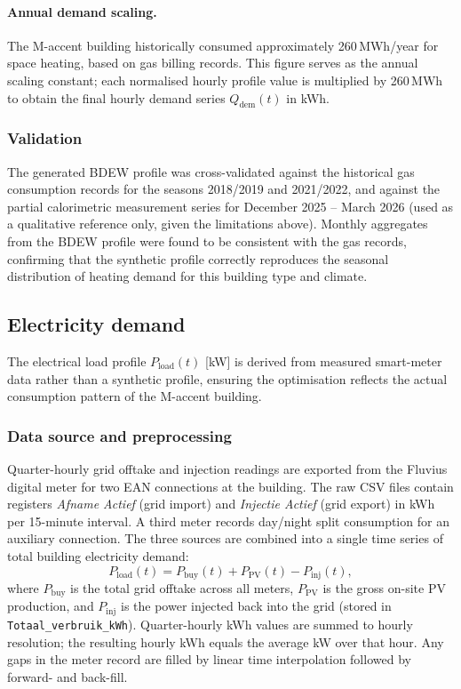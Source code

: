 \documentclass[11pt,a4paper]{report}
\begin{document}
\paragraph{Annual demand scaling.}
The M-accent building historically consumed approximately 260\,MWh/year for space heating, based on gas billing records.
This figure serves as the annual scaling constant; each normalised hourly profile value is multiplied by 260\,MWh to obtain the final hourly demand series $Q_\mathrm{dem}(t)$ in kWh.

\subsubsection*{Validation}

The generated BDEW profile was cross-validated against the historical gas consumption records for the seasons 2018/2019 and 2021/2022, and against the partial calorimetric measurement series for December 2025 -- March 2026 (used as a qualitative reference only, given the limitations above).
Monthly aggregates from the BDEW profile were found to be consistent with the gas records, confirming that the synthetic profile correctly reproduces the seasonal distribution of heating demand for this building type and climate.


\subsection{Electricity demand}
\label{subsec:elec_demand}

The electrical load profile $P_\mathrm{load}(t)$ [kW] is derived from measured
smart-meter data rather than a synthetic profile, ensuring the optimisation
reflects the actual consumption pattern of the M-accent building.

\subsubsection{Data source and preprocessing}

Quarter-hourly grid offtake and injection readings are exported from the Fluvius
digital meter for two EAN connections at the building.
The raw CSV files contain registers \textit{Afname Actief} (grid import) and
\textit{Injectie Actief} (grid export) in kWh per 15-minute interval.
A third meter records day/night split consumption for an auxiliary connection.
The three sources are combined into a single time series of total building
electricity demand:
\begin{equation}
    P_\mathrm{load}(t) = P_\mathrm{buy}(t) + P_\mathrm{PV}(t) - P_\mathrm{inj}(t),
    \label{eq:elec_demand}
\end{equation}
where $P_\mathrm{buy}$ is the total grid offtake across all meters,
$P_\mathrm{PV}$ is the gross on-site PV production, and $P_\mathrm{inj}$ is the
power injected back into the grid (stored in \texttt{Totaal\_verbruik\_kWh}).
Quarter-hourly kWh values are summed to hourly resolution; the resulting hourly
kWh equals the average kW over that hour.
Any gaps in the meter record are filled by linear time interpolation followed by
forward- and back-fill.
\end{document}

